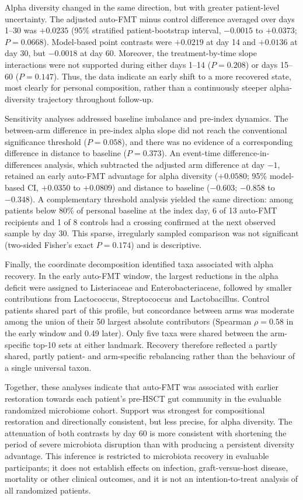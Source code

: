 Alpha diversity changed in the same direction, but with greater patient-level
uncertainty. The adjusted auto-FMT minus control difference averaged over days
1--30 was $+0.0235$ (95\% stratified patient-bootstrap interval, $-0.0015$ to
$+0.0373$; $P=0.0668$). Model-based point contrasts were $+0.0219$ at day 14
and $+0.0136$ at day 30, but $-0.0018$ at day 60. Moreover, the
treatment-by-time slope interactions were not supported during either days
1--14 ($P=0.208$) or days 15--60 ($P=0.147$). Thus, the data indicate an early
shift to a more recovered state, most clearly for personal composition, rather
than a continuously steeper alpha-diversity trajectory throughout follow-up.

Sensitivity analyses addressed baseline imbalance and pre-index dynamics. The
between-arm difference in pre-index alpha slope did not reach the conventional
significance threshold ($P=0.058$), and there was no evidence of a corresponding
difference in distance to baseline ($P=0.373$). An event-time
difference-in-differences analysis, which subtracted the adjusted arm
difference at day $-1$, retained an early auto-FMT advantage for alpha
diversity ($+0.0580$; 95\% model-based CI, $+0.0350$ to $+0.0809$) and distance
to baseline ($-0.603$; $-0.858$ to $-0.348$). A complementary threshold
analysis yielded the same direction: among patients below 80\% of personal
baseline at the index day, 6 of 13 auto-FMT recipients and 1 of 8 controls had
a crossing confirmed at the next observed sample by day 30. This sparse,
irregularly sampled comparison was not significant (two-sided Fisher's exact
$P=0.174$) and is descriptive.

Finally, the coordinate decomposition identified taxa associated with alpha
recovery. In the early auto-FMT window, the largest reductions in the alpha
deficit were assigned to Listeriaceae and Enterobacteriaceae, followed by
smaller contributions from Lactococcus, Streptococcus and Lactobacillus.
Control patients shared part of this profile, but concordance between arms was
moderate among the union of their 50 largest absolute contributors (Spearman
$\rho=0.58$ in the early window and 0.49 later). Only five taxa were shared
between the arm-specific top-10 sets at either landmark. Recovery therefore
reflected a partly shared, partly patient- and arm-specific rebalancing rather
than the behaviour of a single universal taxon.

Together, these analyses indicate that auto-FMT was associated with earlier
restoration towards each patient's pre-HSCT gut community in the evaluable
randomized microbiome cohort. Support was strongest for compositional
restoration and directionally consistent, but less precise, for alpha
diversity. The attenuation of both contrasts by day 60 is more consistent with
shortening the period of severe microbiota disruption than with producing a
persistent diversity advantage. This inference is restricted to microbiota
recovery in evaluable participants; it does not establish effects on infection,
graft-versus-host disease, mortality or other clinical outcomes, and it is not
an intention-to-treat analysis of all randomized patients.

